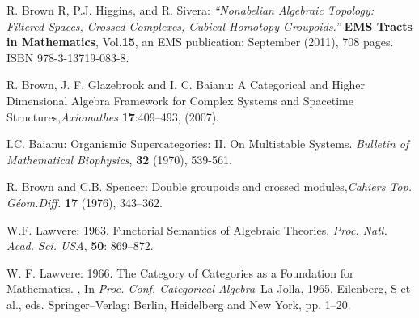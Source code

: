 \documentclass[12pt]{article}
\theoremstyle{plain}
\theoremstyle{definition}
\numberwithin{equation}{section}
\begin{document}
\begin{thebibliography}{99}

R. Brown R, P.J. Higgins, and R. Sivera: {\em ``Nonabelian Algebraic Topology: Filtered Spaces, Crossed Complexes, Cubical Homotopy Groupoids.''} {\bf EMS Tracts in Mathematics}, Vol.{\bf 15}, an EMS publication: September (2011), 708 pages. ISBN 978-3-13719-083-8.

R. Brown, J. F. Glazebrook and I. C. Baianu: A Categorical and Higher Dimensional Algebra Framework for Complex Systems and Spacetime Structures,{\em Axiomathes} \textbf{17}:409--493, (2007).

I.C. Baianu: Organismic Supercategories: II. On Multistable Systems. \emph{Bulletin of Mathematical Biophysics}, \textbf{32} (1970), 539-561.

R. Brown  and C.B. Spencer: Double groupoids and crossed modules,\emph{Cahiers Top. G\'{e}om.Diff.} \textbf{17} (1976), 343--362.

W.F. Lawvere: 1963. Functorial Semantics of Algebraic Theories. {\em Proc. Natl. Acad. Sci. USA}, {\bf 50}: 869--872.

W. F. Lawvere: 1966. The Category of Categories as a Foundation for Mathematics. , In {\em Proc. Conf. Categorical Algebra}--La Jolla, 1965, Eilenberg, S et al., eds. Springer--Verlag: Berlin, Heidelberg and New York, pp. 1--20.
\end{thebibliography}

\end{document}
